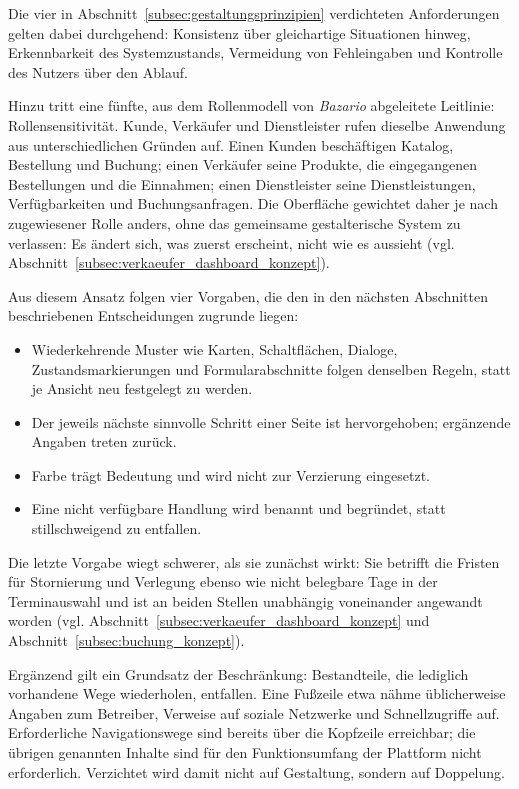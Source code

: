 Die vier in Abschnitt~\ref{subsec:gestaltungsprinzipien} verdichteten
Anforderungen gelten dabei durchgehend: Konsistenz über gleichartige
Situationen hinweg, Erkennbarkeit des Systemzustands, Vermeidung von
Fehleingaben und Kontrolle des Nutzers über den Ablauf.

Hinzu tritt eine fünfte, aus dem Rollenmodell von \textit{Bazario}
abgeleitete Leitlinie: Rollensensitivität. Kunde, Verkäufer und
Dienstleister rufen dieselbe Anwendung aus unterschiedlichen Gründen
auf. Einen Kunden beschäftigen Katalog, Bestellung und Buchung; einen
Verkäufer seine Produkte, die eingegangenen Bestellungen und die
Einnahmen; einen Dienstleister seine Dienstleistungen,
Verfügbarkeiten und Buchungsanfragen. Die
Oberfläche gewichtet daher je nach zugewiesener Rolle anders, ohne
das gemeinsame gestalterische System zu verlassen: Es ändert sich,
was zuerst erscheint, nicht wie es aussieht (vgl.
Abschnitt~\ref{subsec:verkaeufer_dashboard_konzept}).

Aus diesem Ansatz folgen vier Vorgaben, die den in den nächsten
Abschnitten beschriebenen Entscheidungen zugrunde liegen:

\begin{itemize}
\item Wiederkehrende Muster wie Karten, Schaltflächen, Dialoge,
      Zustandsmarkierungen und Formularabschnitte folgen denselben
      Regeln, statt je Ansicht neu festgelegt zu werden.
\item Der jeweils nächste sinnvolle Schritt einer Seite ist
      hervorgehoben; ergänzende Angaben treten zurück.
\item Farbe trägt Bedeutung und wird nicht zur Verzierung eingesetzt.
\item Eine nicht verfügbare Handlung wird benannt und begründet,
      statt stillschweigend zu entfallen.
\end{itemize}

Die letzte Vorgabe wiegt schwerer, als sie zunächst wirkt: Sie
betrifft die Fristen für Stornierung und Verlegung ebenso wie nicht
belegbare Tage in der Terminauswahl und ist an beiden Stellen
unabhängig voneinander angewandt worden (vgl.
Abschnitt~\ref{subsec:verkaeufer_dashboard_konzept} und
Abschnitt~\ref{subsec:buchung_konzept}).

Ergänzend gilt ein Grundsatz der Beschränkung: Bestandteile, die
lediglich vorhandene Wege wiederholen, entfallen. Eine Fußzeile etwa
nähme üblicherweise Angaben zum Betreiber, Verweise auf soziale
Netzwerke und Schnellzugriffe auf. Erforderliche Navigationswege sind bereits über die Kopfzeile
erreichbar; die übrigen genannten Inhalte sind für den
Funktionsumfang der Plattform nicht erforderlich. Verzichtet wird damit
nicht auf Gestaltung, sondern auf Doppelung.


